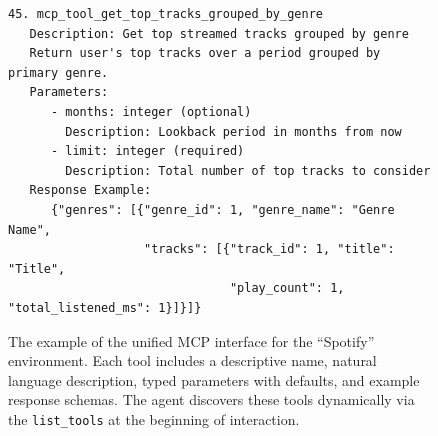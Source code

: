 \begin{figure}[t]
\begin{minipage}{0.97\textwidth}
\begin{lstlisting}[style=pythonstyle, numbers=none]
45. mcp_tool_get_top_tracks_grouped_by_genre
   Description: Get top streamed tracks grouped by genre
   Return user's top tracks over a period grouped by primary genre.
   Parameters:
      - months: integer (optional)
        Description: Lookback period in months from now
      - limit: integer (required)
        Description: Total number of top tracks to consider
   Response Example:
      {"genres": [{"genre_id": 1, "genre_name": "Genre Name",
                   "tracks": [{"track_id": 1, "title": "Title",
                               "play_count": 1, "total_listened_ms": 1}]}]}
\end{lstlisting}
\end{minipage}
\caption{The example of the unified MCP interface for the ``Spotify'' environment.
Each tool includes a descriptive name, natural language description, typed parameters with defaults, and example response schemas.
The agent discovers these tools dynamically via the \texttt{list\_tools} at the beginning of interaction.}
\label{fig:toolset-demo}
\end{figure}
